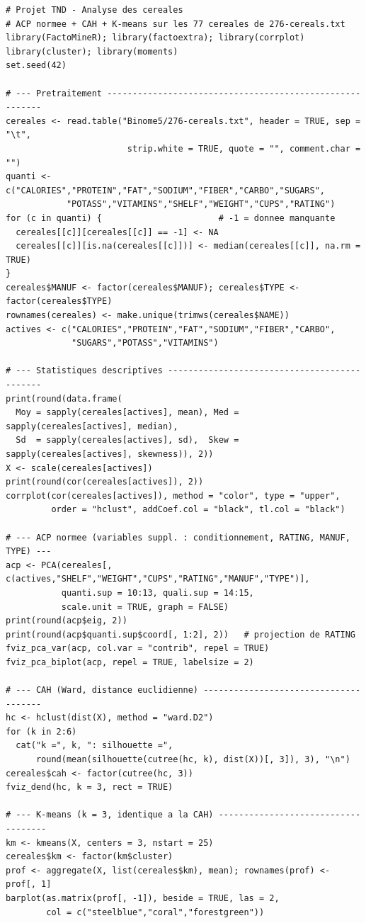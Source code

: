 \documentclass[
]{article}
\begin{document}
{\footnotesize
\begin{verbatim}
# Projet TND - Analyse des cereales
# ACP normee + CAH + K-means sur les 77 cereales de 276-cereals.txt
library(FactoMineR); library(factoextra); library(corrplot)
library(cluster); library(moments)
set.seed(42)

# --- Pretraitement ---------------------------------------------------------
cereales <- read.table("Binome5/276-cereals.txt", header = TRUE, sep = "\t",
                        strip.white = TRUE, quote = "", comment.char = "")
quanti <- c("CALORIES","PROTEIN","FAT","SODIUM","FIBER","CARBO","SUGARS",
            "POTASS","VITAMINS","SHELF","WEIGHT","CUPS","RATING")
for (c in quanti) {                       # -1 = donnee manquante
  cereales[[c]][cereales[[c]] == -1] <- NA
  cereales[[c]][is.na(cereales[[c]])] <- median(cereales[[c]], na.rm = TRUE)
}
cereales$MANUF <- factor(cereales$MANUF); cereales$TYPE <- factor(cereales$TYPE)
rownames(cereales) <- make.unique(trimws(cereales$NAME))
actives <- c("CALORIES","PROTEIN","FAT","SODIUM","FIBER","CARBO",
             "SUGARS","POTASS","VITAMINS")

# --- Statistiques descriptives ---------------------------------------------
print(round(data.frame(
  Moy = sapply(cereales[actives], mean), Med = sapply(cereales[actives], median),
  Sd  = sapply(cereales[actives], sd),  Skew = sapply(cereales[actives], skewness)), 2))
X <- scale(cereales[actives])
print(round(cor(cereales[actives]), 2))
corrplot(cor(cereales[actives]), method = "color", type = "upper",
         order = "hclust", addCoef.col = "black", tl.col = "black")

# --- ACP normee (variables suppl. : conditionnement, RATING, MANUF, TYPE) ---
acp <- PCA(cereales[, c(actives,"SHELF","WEIGHT","CUPS","RATING","MANUF","TYPE")],
           quanti.sup = 10:13, quali.sup = 14:15,
           scale.unit = TRUE, graph = FALSE)
print(round(acp$eig, 2))
print(round(acp$quanti.sup$coord[, 1:2], 2))   # projection de RATING
fviz_pca_var(acp, col.var = "contrib", repel = TRUE)
fviz_pca_biplot(acp, repel = TRUE, labelsize = 2)

# --- CAH (Ward, distance euclidienne) --------------------------------------
hc <- hclust(dist(X), method = "ward.D2")
for (k in 2:6)
  cat("k =", k, ": silhouette =",
      round(mean(silhouette(cutree(hc, k), dist(X))[, 3]), 3), "\n")
cereales$cah <- factor(cutree(hc, 3))
fviz_dend(hc, k = 3, rect = TRUE)

# --- K-means (k = 3, identique a la CAH) ------------------------------------
km <- kmeans(X, centers = 3, nstart = 25)
cereales$km <- factor(km$cluster)
prof <- aggregate(X, list(cereales$km), mean); rownames(prof) <- prof[, 1]
barplot(as.matrix(prof[, -1]), beside = TRUE, las = 2,
        col = c("steelblue","coral","forestgreen"))


\end{verbatim}}
\end{document}
